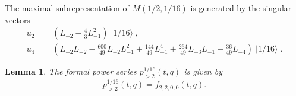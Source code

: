 \documentclass[a4paper, 12pt, reqno]{amsart}
\newtheorem{lemma}[theorem]{Lemma}
\theoremstyle{remark}
\numberwithin{equation}{subsection}
\DeclareMathOperator{\vacsixteen}{|1/16\rangle}
\begin{document}
The maximal subrepresentation of $M(1/2, 1/16)$ is generated by the singular vectors
\begin{align*}
  u_2 &= (L_{-2} - \tfrac{4}{3} L_{-1}^2)\vacsixteen, \\
  u_4 &= (L_{-2}L_{-2} - \tfrac{600}{49}L_{-2}L_{-1}^2 + \tfrac{144}{49}L_{-1}^4 + \tfrac{264}{49}L_{-3}L_{-1} - \tfrac{36}{49}L_{-4})\vacsixteen.
\end{align*}

\begin{lemma}
  \label{lmm:32}
  The formal power series $p^{1/16}_{>2}(t, q)$ is given by
  \begin{equation*}
    p^{1/16}_{>2}(t, q) = f_{2, 2, 0, 0}(t, q).
  \end{equation*}
\end{lemma}
\end{document}
